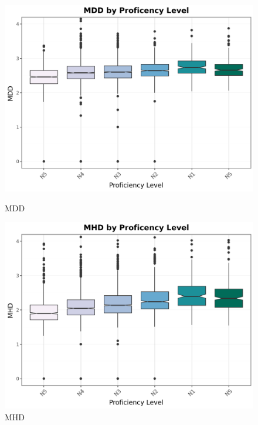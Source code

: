 \begin{figure}[htbp]
    \centering
    \begin{minipage}{.48\textwidth}
        \centering
    \includegraphics[scale=.4]{img/MDD}
    \caption[Mean Dependency Distance across JLPT Proficency Levels]{MDD}
        \label{fig:mdd}
    \end{minipage}
    \hfill
\begin{minipage}{.48\textwidth}
        \centering
        \includegraphics[scale=.4]{img/MHD}
        \caption[Mean Hierarchtical Distance across JLPT Proficency Levels]{MHD}
\label{fig:mhd}
\end{minipage}
    \end{figure}


